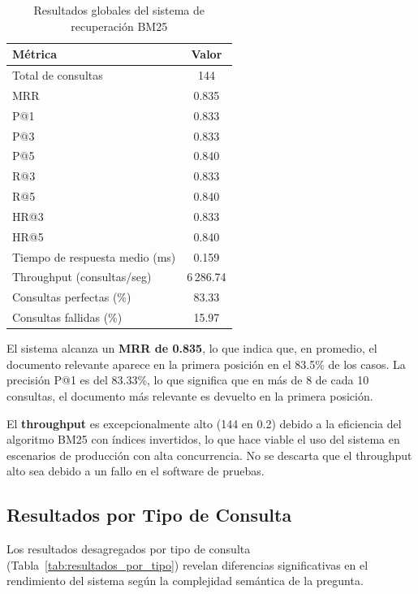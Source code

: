 \begin{table}[h]
\centering
\caption{Resultados globales del sistema de recuperación BM25}
\label{tab:resultados_globales}
\begin{tabular}{lc}
\hline
\textbf{Métrica} & \textbf{Valor} \\ \hline
Total de consultas & 144 \\
MRR & 0.835 \\
P@1 & 0.833 \\
P@3 & 0.833 \\
P@5 & 0.840 \\
R@3 & 0.833 \\
R@5 & 0.840 \\
HR@3 & 0.833 \\
HR@5 & 0.840 \\
Tiempo de respuesta medio (ms) & 0.159 \\
Throughput (consultas/seg) & 6\,286.74 \\
Consultas perfectas (\%) & 83.33 \\
Consultas fallidas (\%) & 15.97 \\ \hline
\end{tabular}
\end{table}

El sistema alcanza un \textbf{MRR de 0.835}, lo que indica que, en promedio, el documento relevante aparece en la primera posición en el 83.5\% de los casos. La precisión P@1 es del 83.33\%, lo que significa que en más de 8 de cada 10 consultas, el documento más relevante es devuelto en la primera posición.

El \textbf{throughput} es excepcionalmente alto (144 en 0.2) debido a la eficiencia del algoritmo BM25 con índices invertidos, lo que hace viable el uso del sistema en escenarios de producción con alta concurrencia. No se descarta que el throughput alto sea debido a un fallo en el software de pruebas.

\subsection{Resultados por Tipo de Consulta}

Los resultados desagregados por tipo de consulta (Tabla~\ref{tab:resultados_por_tipo}) revelan diferencias significativas en el rendimiento del sistema según la complejidad semántica de la pregunta.

